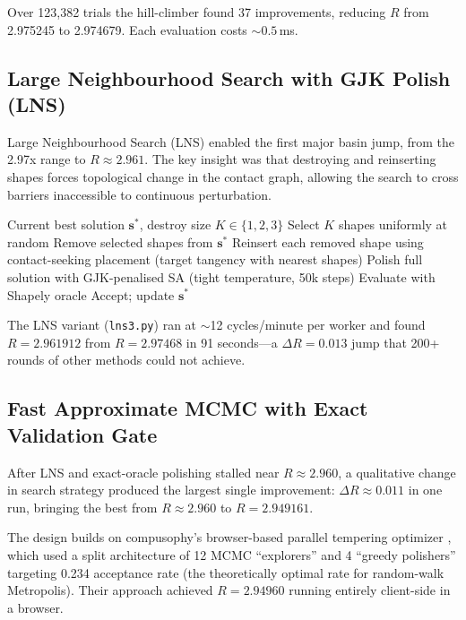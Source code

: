 \documentclass[11pt]{article}
\begin{document}
Over 123{,}382 trials the hill-climber found 37 improvements, reducing $R$ from 2.975245 to 2.974679. Each evaluation costs ${\sim}0.5$\,ms.

\subsection{Large Neighbourhood Search with GJK Polish (LNS)}
\label{sec:lns}

Large Neighbourhood Search (LNS) \citep{shaw1998} enabled the first major basin jump, from the 2.97x range to $R \approx 2.961$.
The key insight was that destroying and reinserting shapes forces topological change in the contact graph, allowing the search to cross barriers inaccessible to continuous perturbation.

\begin{algorithm}[t]
\caption{LNS with GJK Polish}\label{alg:lns}
\begin{algorithmic}[1]
\REQUIRE Current best solution $\mathbf{s}^*$, destroy size $K \in \{1,2,3\}$
  \STATE Select $K$ shapes uniformly at random
  \STATE Remove selected shapes from $\mathbf{s}^*$
  \STATE Reinsert each removed shape using contact-seeking placement (target tangency with nearest shapes)
  \STATE Polish full solution with GJK-penalised SA (tight temperature, 50k steps)
  \STATE Evaluate with Shapely oracle
    \STATE Accept; update $\mathbf{s}^*$
  \ENDIF
\ENDWHILE
\end{algorithmic}
\end{algorithm}

The LNS variant (\texttt{lns3.py}) ran at ${\sim}$12 cycles/minute per worker and found $R = 2.961912$ from $R = 2.97468$ in 91 seconds---a $\Delta R = 0.013$ jump that 200+ rounds of other methods could not achieve.

\subsection{Fast Approximate MCMC with Exact Validation Gate}
\label{sec:fastmcmc}

After LNS and exact-oracle polishing stalled near $R \approx 2.960$, a qualitative change in search strategy produced the largest single improvement: $\Delta R \approx 0.011$ in one run, bringing the best from $R \approx 2.960$ to $R = 2.949161$.

The design builds on compusophy's browser-based parallel tempering optimizer \citep{compusophy2026}, which used a split architecture of 12 MCMC ``explorers'' and 4 ``greedy polishers'' targeting 0.234 acceptance rate (the theoretically optimal rate for random-walk Metropolis). Their approach achieved $R = 2.94960$ running entirely client-side in a browser.
\end{document}
